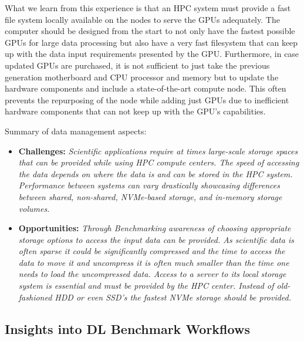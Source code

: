 What we learn from this experience is that an HPC system must provide a fast file system locally available on the nodes to serve the GPUs adequately. The computer should be designed from the start to not only have the fastest possible GPUs for large data processing but also have a very fast filesystem that can keep up with the data input requirements presented by the GPU. Furthermore, in case updated GPUs are purchased, it is not sufficient to just take the previous generation motherboard and CPU processor and memory but to update the hardware components and include a state-of-the-art compute node. This often prevents the repurposing of the node while adding just GPUs due to inefficient hardware components that can not keep up with the GPU's capabilities.

\begin{tcolorbox}
Summary of data management aspects:

\begin{itemize}

\item {\bf Challenges:} {\it Scientific applications require at times large-scale storage spaces that can be provided while using HPC compute centers. The speed of accessing the data depends on where the data is and can be stored in the HPC system. Performance between systems can vary drastically showcasing differences between shared, non-shared, NVMe-based storage, and in-memory storage volumes.}


\item {\bf Opportunities:} {\it Through Benchmarking awareness of choosing appropriate storage options to access the input data can be provided. As scientific data is often sparse it could be significantly compressed and the time to access the data to move it and uncompress it is often much smaller than the time one needs to load the uncompressed data. Access to a server to its local storage system is essential and must be provided by the HPC center. Instead of old-fashioned HDD or even SSD's the fastest NVMe storage should be provided.}

\end{itemize}
\end{tcolorbox}
  


\subsection{Insights into DL Benchmark Workflows}
\label{sec:workflow-main}

